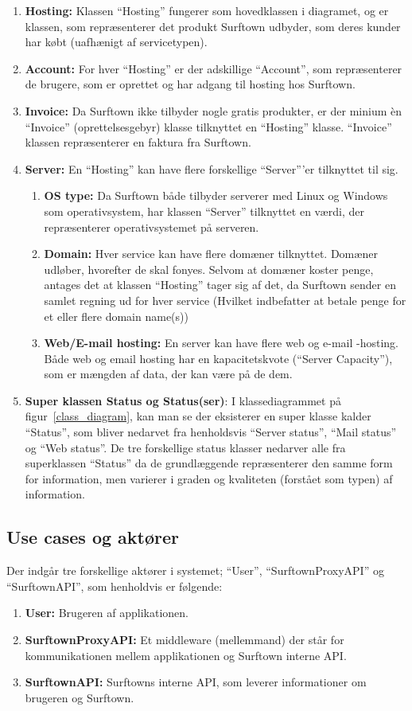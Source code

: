 \documentclass[12pt]{article}
\begin{document}
\begin{enumerate}
	\item{\textbf{Hosting: }Klassen ``Hosting'' fungerer som hovedklassen i diagramet, og er klassen, som repræsenterer det produkt Surftown udbyder, som deres kunder har købt (uafhænigt af servicetypen).}
	\item{\textbf{Account: }For hver ``Hosting'' er der adskillige ``Account'', som repræsenterer de brugere, som er oprettet og har adgang til hosting hos Surftown.}
	\item{\textbf{Invoice: }Da Surftown ikke tilbyder nogle gratis produkter, er der minium èn ``Invoice'' (oprettelsesgebyr)  klasse tilknyttet en ``Hosting'' klasse. ``Invoice'' klassen repræsenterer en faktura fra Surftown.}
	\item{\textbf{Server: }En ``Hosting'' kan have flere forskellige ``Server'''er tilknyttet til sig.
	}\begin{enumerate}
		\item{\textbf{OS type: }Da Surftown både tilbyder serverer med Linux og Windows som operativsystem, har klassen ``Server'' tilknyttet en værdi, der repræsenterer operativsystemet på serveren.}
		\item{\textbf{Domain: }Hver service kan have flere domæner tilknyttet. Domæner udløber, hvorefter de skal fonyes. Selvom at domæner koster penge, antages det at klassen ``Hosting'' tager sig af det, da Surftown sender en samlet regning ud for hver service (Hvilket indbefatter at betale penge for et eller flere domain name(s))}
	\item{\textbf{Web/E-mail hosting: } En server kan have flere web og e-mail -hosting. Både web og email hosting har en kapacitetskvote (``Server Capacity''), som er mængden af data, der kan være på de dem.}
	\end{enumerate}
	\item{\textbf{Super klassen Status og Status(ser)}: } I klassediagrammet på figur~\ref{class_diagram}, kan man se der eksisterer en super klasse kalder ``Status'', som bliver nedarvet fra henholdsvis ``Server status'', ``Mail status'' og ``Web status''. De tre forskellige status klasser nedarver alle fra superklassen ``Status'' da de grundlæggende repræsenterer den samme form for information, men varierer i graden og kvaliteten (forstået som typen) af information.
\end{enumerate}

\subsection*{Use cases og aktører}
Der indgår tre forskellige aktører i systemet; ``User'', ``SurftownProxyAPI'' og ``SurftownAPI'', som henholdvis er følgende:
\begin{enumerate}
	\item{\textbf{User: } Brugeren af applikationen.}
	\item{\textbf{SurftownProxyAPI: } Et middleware (mellemmand) der står for kommunikationen mellem applikationen og Surftown interne API.}
	\item{\textbf{SurftownAPI: } Surftowns interne API, som leverer informationer om brugeren og Surftown.}
\end{enumerate}
\end{document}
